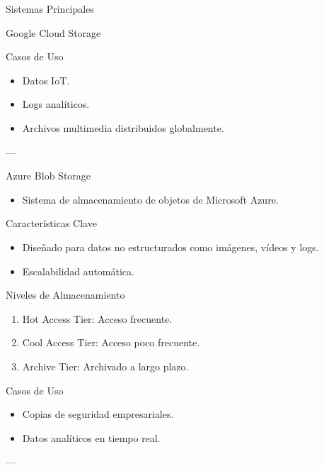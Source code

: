 \documentclass[presentation]{beamer}
\begin{document}
\begin{frame}[label={sec:org317cb5a}]{Sistemas Principales}
\begin{block}{Google Cloud Storage}
\begin{block}{Casos de Uso}
\begin{itemize}
\item Datos IoT.
\item Logs analíticos.
\item Archivos multimedia distribuidos globalmente.
\end{itemize}

---
\end{block}
\end{block}

\begin{block}{Azure Blob Storage}
\begin{itemize}
\item Sistema de almacenamiento de objetos de Microsoft Azure.
\end{itemize}

\begin{block}{Características Clave}
\begin{itemize}
\item Diseñado para datos no estructurados como imágenes, vídeos y logs.
\item Escalabilidad automática.
\end{itemize}
\end{block}

\begin{block}{Niveles de Almacenamiento}
\begin{enumerate}
\item \alert{\alert{Hot Access Tier:}} Acceso frecuente.
\item \alert{\alert{Cool Access Tier:}} Acceso poco frecuente.
\item \alert{\alert{Archive Tier:}} Archivado a largo plazo.
\end{enumerate}
\end{block}

\begin{block}{Casos de Uso}
\begin{itemize}
\item Copias de seguridad empresariales.
\item Datos analíticos en tiempo real.
\end{itemize}

---
\end{block}
\end{block}
\end{frame}
\end{document}
